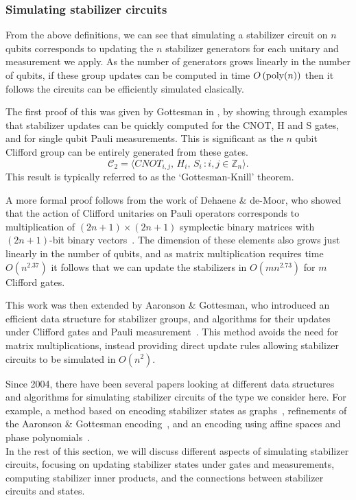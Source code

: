 \subsubsection*{Simulating stabilizer circuits}
From the above definitions, we can see that simulating a stabilizer circuit on $n$ qubits corresponds to updating the $n$ stabilizer generators for each unitary and measurement we apply. As the number of generators grows linearly in the number of qubits, if these group updates can be computed in time $O\left(\text{poly} (n)\right)$ then it follows the circuits can be efficiently simulated clasically.\par
The first proof of this was given by Gottesman in \cite{Gottesman1998b}, by showing through examples that stabilizer updates can be quickly computed for the CNOT, H and S gates, and for single qubit Pauli measurements. This is significant as the $n$ qubit Clifford group can be entirely generated from these gates.
\begin{equation}
    \mathcal{C}_{2} = \langle CNOT_{i,j},\, H_{i},\, S_{i}\,:i,j\in \mathbb{Z}_{n}\rangle. \label{eq:cliffordgen}
\end{equation}
This result is typically referred to as the `Gottesman-Knill' theorem.\par
A more formal proof follows from the work of Dehaene \& de-Moor, who showed that the action of Clifford unitaries on Pauli operators corresponds to multiplication of $(2n+1)\times (2n+1)$ symplectic binary matrices with $(2n+1)$-bit binary vectors~\cite{Dehaene2003}. The dimension of these elements also grows just linearly in the number of qubits, and as matrix multiplication requires time $O(n^{2.37})$ it follows that we can update the stabilizers in $O(mn^{2.73})$ for $m$ Clifford gates.\par
This work was then extended by Aaronson \& Gottesman, who introduced an efficient data structure for stabilizer groups, and algorithms for their updates under Clifford gates and Pauli measurement~\cite{Aaronson2004}. This method avoids the need for matrix multiplications, instead providing direct update rules allowing stabilizer circuits to be simulated in $O(n^{2})$.\par
Since 2004, there have been several papers looking at different data structures and algorithms for simulating stabilizer circuits of the type we consider here. For example, a method based on encoding stabilizer states as graphs~\cite{Anders2006}, refinements of the Aaronson \& Gottesman encoding~\cite{Garcia2012}, and an encoding using affine spaces and phase polynomials~\cite{VandenNest2008,Bravyi2016}.\\
In the rest of this section, we will discuss different aspects of simulating stabilizer circuits, focusing on updating stabilizer states under gates and measurements, computing stabilizer inner products, and the connections between stabilizer circuits and states.
